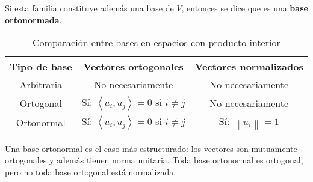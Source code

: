 Si esta familia constituye además una base de \(V\), entonces se dice que es una \textbf{base ortonormada}.

\begin{table}[H]
  \centering
  \begin{tabular}{c|c|c}
    \textbf{Tipo de base} & \textbf{Vectores ortogonales} & \textbf{Vectores normalizados} \\
    \hline
    Arbitraria & No necesariamente & No necesariamente \\
    Ortogonal & Sí: \(\left\langle u_i, u_j \right\rangle = 0\) si \(i \neq j\) & No necesariamente \\
    Ortonormal & Sí: \(\left\langle u_i, u_j \right\rangle = 0\) si \(i \neq j\) & Sí: \(\left\lVert u_i \right\rVert = 1\) \\
  \end{tabular}
  \caption{Comparación entre bases en espacios con producto interior}
\end{table}

Una base ortonormal es el caso más estructurado: los vectores son mutuamente ortogonales y además tienen norma unitaria. Toda base ortonormal es ortogonal, pero no toda base ortogonal está normalizada.